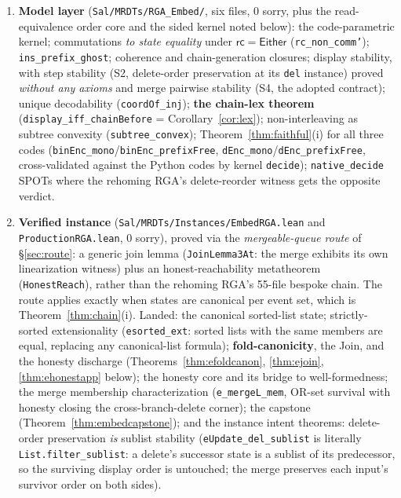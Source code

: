 \documentclass[11pt]{article}
\newcommand{\rcrel}{\mathsf{rc}}                 %
\newcommand{\code}[1]{\texttt{#1}}
\newcommand{\Either}{\textsf{Either}}
\begin{document}
\begin{enumerate}
\item \textbf{Model layer} (\code{Sal/MRDTs/RGA\_Embed/}, six
files, 0 sorry, plus the read-equivalence order core and the sided
kernel noted below): the code-parametric kernel; commutations \emph{to
state equality} under $\rcrel = \Either$ (\code{rc\_non\_comm'});
\code{ins\_prefix\_ghost}; coherence and chain-generation closures;
display stability, with step stability (S2, delete-order preservation at
its \code{del} instance) proved \emph{without any axioms} and merge pairwise
stability (S4, the adopted contract); unique decodability
(\code{coordOf\_inj}); \textbf{the chain-lex theorem}
(\code{display\_iff\_chainBefore} = Corollary~\ref{cor:lex});
non-interleaving as subtree convexity (\code{subtree\_convex});
Theorem~\ref{thm:faithful}(i) for all three codes
(\code{binEnc\_mono}/\code{binEnc\_prefixFree},
\code{dEnc\_mono}/\code{dEnc\_prefixFree}, cross-validated
against the Python codes by kernel \code{decide});
\code{native\_decide} SPOTs where the rehoming RGA's delete-reorder
witness gets the opposite verdict.
\item \textbf{Verified instance}
(\code{Sal/MRDTs/Instances/EmbedRGA.lean} and
\code{ProductionRGA.lean}, 0 sorry), proved via the \emph{mergeable-queue
route} of \S\ref{sec:route}: a
generic join lemma (\code{JoinLemma3At}: the merge exhibits its own
linearization witness) plus an honest-reachability metatheorem
(\code{HonestReach}), rather than the rehoming RGA's 55-file bespoke
chain. The route applies exactly when states are canonical per event
set, which is Theorem~\ref{thm:chain}(i).
Landed: the canonical sorted-list state; strictly-sorted
extensionality (\code{esorted\_ext}: sorted lists with the same
members are equal, replacing any canonical-list formula);
\textbf{fold-canonicity}, the Join, and the honesty discharge
(Theorems~\ref{thm:efoldcanon}, \ref{thm:ejoin},
\ref{thm:ehonestapp} below); the honesty core and its bridge to
well-formedness; the merge membership characterization
(\code{e\_mergeL\_mem}, OR-set survival with honesty closing the
cross-branch-delete corner); the capstone
(Theorem~\ref{thm:embedcapstone}); and the instance intent theorems:
delete-order preservation \emph{is} sublist stability
(\code{eUpdate\_del\_sublist} is literally
\code{List.filter\_sublist}: a delete's successor state is a sublist
of its predecessor, so the surviving display order is untouched;
the merge preserves each input's survivor order on both sides).
\end{enumerate}
\end{document}
